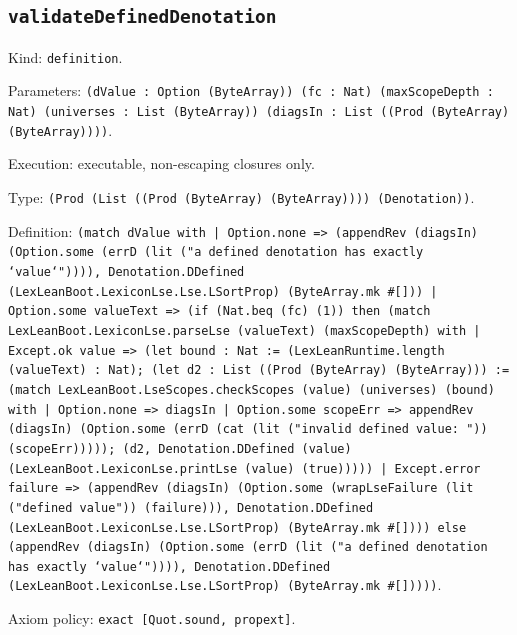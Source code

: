 \documentclass[11pt]{article}
\begin{document}
\subsection*{\texttt{validateDefinedDenotation}}
\noindent Kind: \texttt{definition}.\par
\noindent Parameters: \texttt{(dValue : Option (ByteArray)) (fc : Nat) (maxScopeDepth : Nat) (universes : List (ByteArray)) (diagsIn : List ((Prod (ByteArray) (ByteArray))))}.\par
\noindent Execution: executable, non-escaping closures only.\par
\noindent Type: \texttt{(Prod (List ((Prod (ByteArray) (ByteArray)))) (Denotation))}.\par
\noindent Definition: \texttt{(match dValue with | Option.none => (appendRev (diagsIn) (Option.some (errD (lit ("a defined denotation has exactly `value`")))), Denotation.DDefined (LexLeanBoot.LexiconLse.Lse.LSortProp) (ByteArray.mk \#[])) | Option.some valueText => (if (Nat.beq (fc) (1)) then (match LexLeanBoot.LexiconLse.parseLse (valueText) (maxScopeDepth) with | Except.ok value => (let bound : Nat := (LexLeanRuntime.length (valueText) : Nat); (let d2 : List ((Prod (ByteArray) (ByteArray))) := (match LexLeanBoot.LseScopes.checkScopes (value) (universes) (bound) with | Option.none => diagsIn | Option.some scopeErr => appendRev (diagsIn) (Option.some (errD (cat (lit ("invalid defined value: ")) (scopeErr))))); (d2, Denotation.DDefined (value) (LexLeanBoot.LexiconLse.printLse (value) (true))))) | Except.error failure => (appendRev (diagsIn) (Option.some (wrapLseFailure (lit ("defined value")) (failure))), Denotation.DDefined (LexLeanBoot.LexiconLse.Lse.LSortProp) (ByteArray.mk \#[]))) else (appendRev (diagsIn) (Option.some (errD (lit ("a defined denotation has exactly `value`")))), Denotation.DDefined (LexLeanBoot.LexiconLse.Lse.LSortProp) (ByteArray.mk \#[]))))}.\par
\noindent Axiom policy: \texttt{exact [Quot.sound, propext]}.\par
\end{document}
